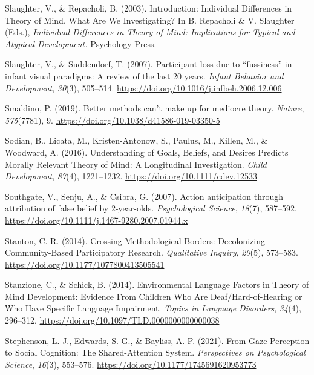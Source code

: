 \documentclass[
]{scrbook}
\newlength{\cslhangindent}
\newenvironment{CSLReferences}[2] %
 {\begin{list}{}{%
  \setlength{\itemindent}{0pt}
  \setlength{\leftmargin}{0pt}
  \setlength{\parsep}{0pt}
  \ifodd #1
   \setlength{\leftmargin}{\cslhangindent}
   \setlength{\itemindent}{-1\cslhangindent}
  \fi
  \setlength{\itemsep}{#2\baselineskip}}}
 {\end{list}}
\begin{document}
\begin{CSLReferences}{1}{0}
Slaughter, V., \& Repacholi, B. (2003). Introduction: {Individual Differences} in {Theory} of {Mind}. {What Are We Investigating}? In B. Repacholi \& V. Slaughter (Eds.), \emph{Individual {Differences} in {Theory} of {Mind}: {Implications} for {Typical} and {Atypical Development}.} Psychology Press.

Slaughter, V., \& Suddendorf, T. (2007). Participant loss due to {``fussiness''} in infant visual paradigms: {A} review of the last 20 years. \emph{Infant Behavior and Development}, \emph{30}(3), 505--514. \url{https://doi.org/10.1016/j.infbeh.2006.12.006}

Smaldino, P. (2019). Better methods can't make up for mediocre theory. \emph{Nature}, \emph{575}(7781), 9. \url{https://doi.org/10.1038/d41586-019-03350-5}

Sodian, B., Licata, M., Kristen-Antonow, S., Paulus, M., Killen, M., \& Woodward, A. (2016). Understanding of {Goals}, {Beliefs}, and {Desires Predicts Morally Relevant Theory} of {Mind}: {A Longitudinal Investigation}. \emph{Child Development}, \emph{87}(4), 1221--1232. \url{https://doi.org/10.1111/cdev.12533}

Southgate, V., Senju, A., \& Csibra, G. (2007). Action anticipation through attribution of false belief by 2-year-olds. \emph{Psychological Science}, \emph{18}(7), 587--592. \url{https://doi.org/10.1111/j.1467-9280.2007.01944.x}

Stanton, C. R. (2014). Crossing {Methodological Borders}: {Decolonizing Community-Based Participatory Research}. \emph{Qualitative Inquiry}, \emph{20}(5), 573--583. \url{https://doi.org/10.1177/1077800413505541}

Stanzione, C., \& Schick, B. (2014). Environmental {Language Factors} in {Theory} of {Mind Development}: {Evidence From Children Who Are Deaf}/{Hard-of-Hearing} or {Who Have Specific Language Impairment}. \emph{Topics in Language Disorders}, \emph{34}(4), 296--312. \url{https://doi.org/10.1097/TLD.0000000000000038}

Stephenson, L. J., Edwards, S. G., \& Bayliss, A. P. (2021). From {Gaze Perception} to {Social Cognition}: {The Shared-Attention System}. \emph{Perspectives on Psychological Science}, \emph{16}(3), 553--576. \url{https://doi.org/10.1177/1745691620953773}


\end{CSLReferences}
\end{document}

